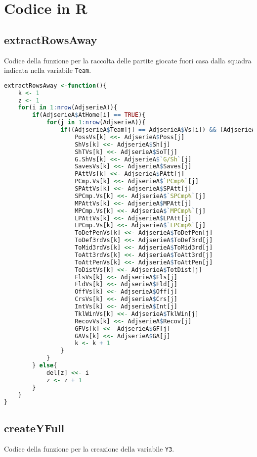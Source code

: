 \chapter{Codice in R}
\section{extractRowsAway}
\label{sez:raccolta}
Codice della funzione per la raccolta delle partite giocate fuori casa dalla squadra indicata nella variabile \texttt{Team}.

\begin{lstlisting}[language=R, caption={Codice di adattamento dataset per il trasferimento dati.}, captionpos=b, label=code:a1]
extractRowsAway <-function(){
	k <- 1
	z <- 1
	for(i in 1:nrow(AdjserieA)){
		if(AdjserieA$AtHome[i] == TRUE){
			for(j in 1:nrow(AdjserieA)){
				if((AdjserieA$Team[j] == AdjserieA$Vs[i]) && (AdjserieA$Team[i] == AdjserieA$Vs[j]) && (AdjserieA$AtHome[j] == FALSE)){
					PossVs[k] <<- AdjserieA$Poss[j]
					ShVs[k] <<- AdjserieA$Sh[j]
					ShTVs[k] <<- AdjserieA$SoT[j]
					G.ShVs[k] <<- AdjserieA$`G/Sh`[j]
					SavesVs[k] <<- AdjserieA$Saves[j]
					PAttVs[k] <<- AdjserieA$PAtt[j]
					PCmp.Vs[k] <<- AdjserieA$`PCmp%`[j]
					SPAttVs[k] <<- AdjserieA$SPAtt[j]
					SPCmp.Vs[k] <<- AdjserieA$`SPCmp%`[j]
					MPAttVs[k] <<- AdjserieA$MPAtt[j]
					MPCmp.Vs[k] <<- AdjserieA$`MPCmp%`[j]
					LPAttVs[k] <<- AdjserieA$LPAtt[j]
					LPCmp.Vs[k] <<- AdjserieA$`LPCmp%`[j]
					ToDefPenVs[k] <<- AdjserieA$ToDefPen[j]
					ToDef3rdVs[k] <<- AdjserieA$ToDef3rd[j]
					ToMid3rdVs[k] <<- AdjserieA$ToMid3rd[j]
					ToAtt3rdVs[k] <<- AdjserieA$ToAtt3rd[j]
					ToAttPenVs[k] <<- AdjserieA$ToAttPen[j]
					ToDistVs[k] <<- AdjserieA$TotDist[j]
					FlsVs[k] <<- AdjserieA$Fls[j]
					FldVs[k] <<- AdjserieA$Fld[j]
					OffVs[k] <<- AdjserieA$Off[j]
					CrsVs[k] <<- AdjserieA$Crs[j]
					IntVs[k] <<- AdjserieA$Int[j]
					TklWinVs[k] <<- AdjserieA$TklWin[j]
					RecovVs[k] <<- AdjserieA$Recov[j]
					GFVs[k] <<- AdjserieA$GF[j]
					GAVs[k] <<- AdjserieA$GA[j]
					k <- k + 1  
				}      
			}
		} else{
			del[z] <<- i
			z <- z + 1
		}
	}
}
\end{lstlisting}

\section{createYFull}
\label{sez:y3}
Codice della funzione per la creazione della variabile \texttt{Y3}.

